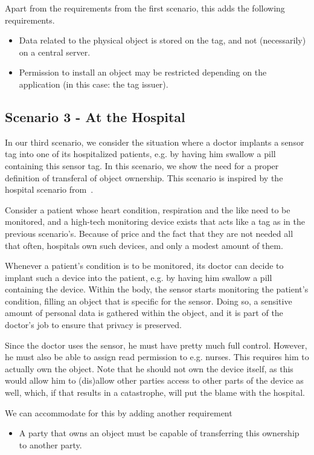 Apart from the requirements from the first scenario, this adds the following
requirements.
\begin{itemize}
\fixlistspacing
\item Data related to the physical object is stored on the tag, and not
  (necessarily) on a central server.
\item Permission to install an object may be restricted depending on the application (in this case: the tag issuer).
\end{itemize}

\subsection{Scenario 3 - At the Hospital}

In our third scenario, we consider the situation where a doctor implants
a sensor tag into one of its hospitalized patients, e.g. by having him swallow a pill 
containing this sensor tag. In this scenario, we show the need for a proper 
definition of transferal of object ownership.
This scenario is inspired by the hospital scenario from~\cite{StaA99}.

Consider a patient whose heart condition, respiration and the like need 
to be monitored, and a high-tech monitoring device exists that acts like
a tag as in the previous scenario's. Because of price and the fact that they 
are not needed all that often, hospitals own such devices, and only a modest
amount of them.

Whenever a patient's condition is to be monitored, its doctor can decide to
implant such a device into the patient, e.g. by having him swallow a pill
containing the device. Within the body, the sensor starts monitoring the
patient's condition, filling an object that is specific for the sensor. Doing
so, a sensitive amount of personal data is gathered within the object, and it
is part of the doctor's job to ensure that privacy is preserved.

Since the doctor uses the sensor, he must have pretty much full
control. However, he must also be able to assign read permission to
e.g. nurses. This requires him to actually own the object. Note that he should
not own the device itself, as this would allow him to (dis)allow other parties
access to other parts of the device as well, which, if that results in a
catastrophe, will put the blame with the hospital.

We can accommodate for this by adding another requirement
\begin{itemize}
\fixlistspacing
\item A party that owns an object must be capable of transferring this
   ownership to another party. 
\end{itemize}

